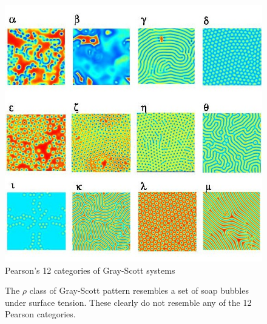 \begin{figure}[!h]
\centering
\includegraphics[width=.95\textwidth]{images/pearsons.jpg}
\caption{Pearson's 12 categories of Gray-Scott systems\cite{pearson1993complex}}
\label{fig:pearsons}
\end{figure}

\begin{figure}[!h]
\centering
            \hfill
            \hfill
            \hfill
            \hfill
            \caption{The $\rho$ class of Gray-Scott pattern resembles a set of soap bubbles under surface tension. These clearly do not resemble any of the 12 Pearson categories. \cite{munafo}}
\label{fig:munafo-rho}
\end{figure}

